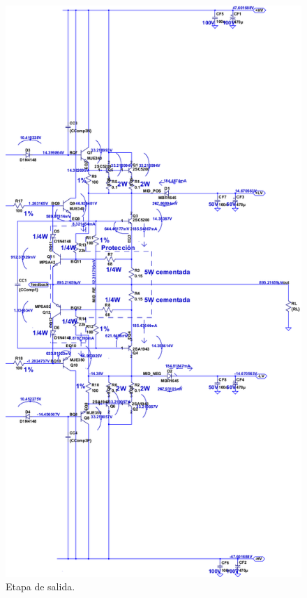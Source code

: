 \begin{figure}[H]
\centering
   \includegraphics[height=0.66\paperheight]{img/output_stage.png}
   \caption{Etapa de salida.}
   \label{fig:output_stage}  
\end{figure}



\clearpage



